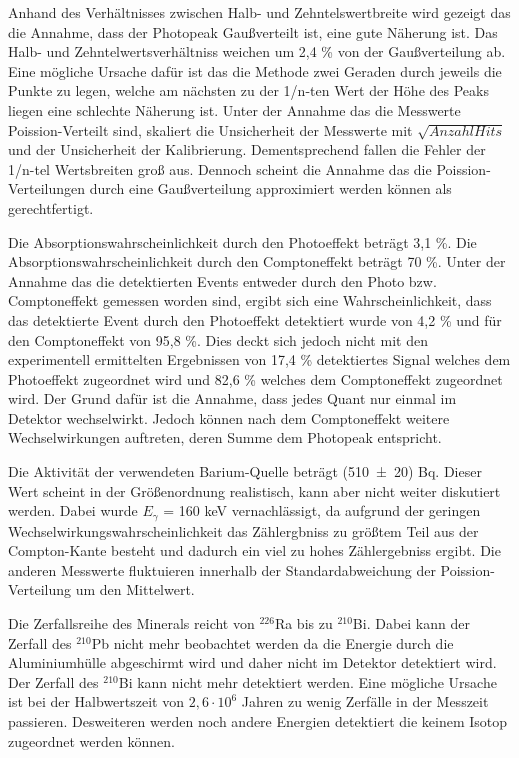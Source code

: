 Anhand des Verhältnisses zwischen Halb- und Zehntelswertbreite wird gezeigt das die Annahme, dass der Photopeak Gaußverteilt ist, eine gute Näherung ist. Das Halb- und Zehntelwertsverhältniss weichen um 2,4 \% von der Gaußverteilung ab. Eine mögliche Ursache dafür ist das die Methode zwei Geraden durch jeweils die Punkte zu legen, welche am nächsten zu der 1/n-ten Wert der Höhe des Peaks liegen eine schlechte Näherung ist. Unter der Annahme das die Messwerte Poission-Verteilt sind, skaliert die Unsicherheit der Messwerte mit $\sqrt{Anzahl Hits}$ und der Unsicherheit der Kalibrierung. Dementsprechend fallen die Fehler der 1/n-tel Wertsbreiten groß aus. Dennoch scheint die Annahme das die Poission-Verteilungen durch eine Gaußverteilung approximiert werden können als gerechtfertigt.

Die Absorptionswahrscheinlichkeit durch den Photoeffekt beträgt 3,1 \%. Die Absorptionswahrscheinlichkeit durch den Comptoneffekt beträgt 70 \%. Unter der Annahme das die detektierten Events entweder durch den Photo bzw. Comptoneffekt gemessen worden sind, ergibt sich eine Wahrscheinlichkeit, dass das detektierte Event durch den Photoeffekt detektiert wurde von 4,2 \% und für den Comptoneffekt von 95,8 \%. Dies deckt sich jedoch nicht mit den experimentell ermittelten Ergebnissen von 17,4 \% detektiertes Signal welches dem Photoeffekt zugeordnet wird und 82,6 \% welches dem Comptoneffekt zugeordnet wird. Der Grund dafür ist die Annahme, dass jedes Quant nur einmal im Detektor wechselwirkt. Jedoch können nach dem Comptoneffekt weitere Wechselwirkungen auftreten, deren Summe dem Photopeak entspricht.

Die Aktivität der verwendeten Barium-Quelle beträgt (\num{510 +- 20}) Bq. Dieser Wert scheint in der Größenordnung realistisch, kann aber nicht weiter diskutiert werden. Dabei wurde $E_\gamma$ = 160 keV vernachlässigt, da aufgrund der geringen Wechselwirkungswahrscheinlichkeit das Zählergbniss zu größtem Teil aus der Compton-Kante besteht und dadurch ein viel zu hohes Zählergebniss ergibt. Die anderen Messwerte fluktuieren innerhalb der Standardabweichung der Poission-Verteilung um den Mittelwert.

Die Zerfallsreihe des Minerals reicht von $^{226}$Ra bis zu $^{210}$Bi. Dabei kann der Zerfall des $^{210}$Pb nicht mehr beobachtet werden da die Energie durch die Aluminiumhülle abgeschirmt wird und daher nicht im Detektor detektiert wird. Der Zerfall des $^{210}$Bi kann nicht mehr detektiert werden. Eine mögliche Ursache ist bei der Halbwertszeit von $2,6 \cdot 10^6$ Jahren zu wenig Zerfälle in der Messzeit passieren. Desweiteren werden noch andere Energien detektiert die keinem Isotop zugeordnet werden können.
